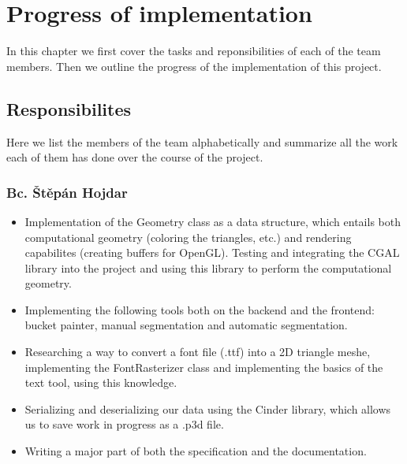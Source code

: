 \chapter{Progress of implementation}

In this chapter we first cover the tasks and reponsibilities of each of the team members. Then we outline the progress of the implementation of this project.

\section{Responsibilites}

Here we list the members of the team alphabetically and summarize all the work each of them has done over the course of the project.

\subsection{Bc. Štěpán Hojdar}
\begin{itemize}
\item Implementation of the Geometry class as a data structure, which entails both computational geometry (coloring the triangles, etc.) and rendering capabilites (creating buffers for OpenGL). Testing and integrating the CGAL library into the project and using this library to perform the computational geometry.
\item Implementing the following tools both on the backend and the frontend: bucket painter, manual segmentation and automatic segmentation.
\item Researching a way to convert a font file (.ttf) into a 2D triangle meshe, implementing the FontRasterizer class and implementing the basics of the text tool, using this knowledge.
\item Serializing and deserializing our data using the Cinder library, which allows us to save work in progress as a .p3d file.
\item Writing a major part of both the specification and the documentation.
\end{itemize}


